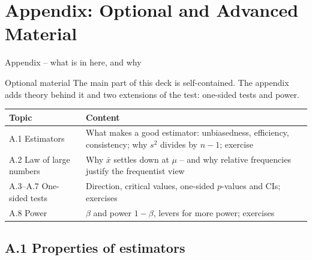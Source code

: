 \documentclass[aspectratio=169,11pt]{beamer}
\newcommand{\overviewleft}{1-3}
\begin{document}
\appendix
\let\overviewleft\undefined
\section[Appendix]{Appendix: Optional and Advanced Material}

\begin{frame}{Appendix -- what is in here, and why}
  \begin{block}{Optional material}
    The main part of this deck is self-contained. The appendix adds theory
    behind it and two extensions of the test: one-sided tests and power.
  \end{block}
  \begin{center}
    \small\renewcommand{\arraystretch}{1.15}
    \begin{tabular}{@{}l>{\raggedright\arraybackslash}p{9.4cm}@{}}
      \toprule
      \textbf{Topic} & \textbf{Content}\\
      \midrule
      A.1 Estimators & What makes a good estimator: unbiasedness, efficiency,
        consistency; why $s^2$ divides by $n-1$; exercise\\
      A.2 Law of large numbers & Why $\bar x$ settles down at $\mu$ -- and why
        relative frequencies justify the frequentist view\\
      A.3--A.7 One-sided tests & Direction, critical values, one-sided
        $p$-values and CIs; exercises\\
      A.8 Power & $\beta$ and power $1-\beta$, levers for more power; exercises\\
      \bottomrule
    \end{tabular}
  \end{center}
\end{frame}

\subsection{A.1 Properties of estimators}
\end{document}
